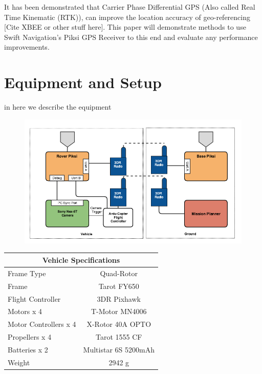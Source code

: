 \documentclass{article}
\begin{document}
It has been demonstrated that Carrier Phase Differential GPS (Also called Real Time Kinematic (RTK)), can improve the location accuracy of geo-referencing [Cite XBEE or other stuff here].  This paper will demonstrate methods to use Swift Navigation's Piksi GPS Receiver to this end and evaluate any performance improvements.

\section{Equipment and Setup}
\label{sec:equipment}in
here we describe the equipment
\begin{figure}[h]
\includegraphics[width=7in]{images/flow_charts/uav_piksi_flow_chart.png}
\end{figure}
\begin{table}[]
\centering
\label{my-label}
\begin{tabular}{|l|c|}
\hline
\multicolumn{2}{|c|}{Vehicle Specifications} \\ \hline
Frame Type            & Quad-Rotor           \\ \hline
Frame                 & Tarot FY650          \\ \hline
Flight Controller     & 3DR Pixhawk          \\ \hline
Motors x 4            & T-Motor MN4006       \\ \hline
Motor Controllers x 4 & X-Rotor 40A OPTO     \\ \hline
Propellers x 4        & Tarot 1555 CF        \\ \hline
Batteries x 2         & Multistar 6S 5200mAh \\ \hline
Weight                & 2942 g               \\ \hline
\end{tabular}
\end{table}
\end{document}
